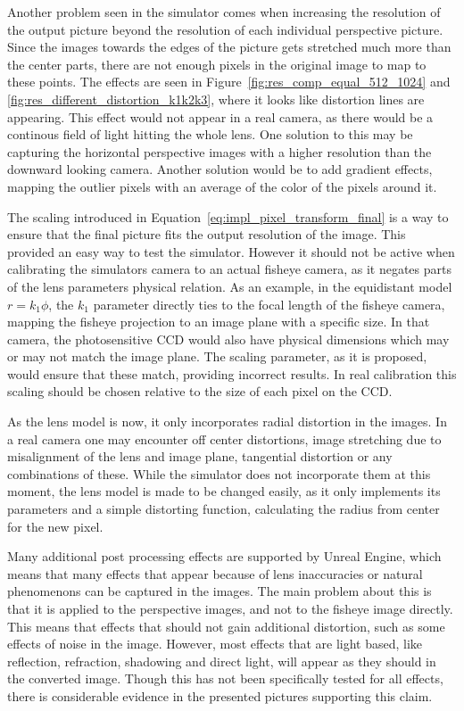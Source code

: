 Another problem seen in the simulator comes when increasing the resolution of the output picture beyond the resolution of each individual perspective picture. Since the images towards the edges of the picture gets stretched much more than the center parts, there are not enough pixels in the original image to map to these points. The effects are seen in Figure~\ref{fig:res_comp_equal_512_1024} and \ref{fig:res_different_distortion_k1k2k3}, where it looks like distortion lines are appearing. This effect would not appear in a real camera, as there would be a continous field of light hitting the whole lens. One solution to this may be capturing the horizontal perspective images with a higher resolution than the downward looking camera. Another solution would be to add gradient effects, mapping the outlier pixels with an average of the color of the pixels around it. 

The scaling introduced in Equation~\eqref{eq:impl_pixel_transform_final} is a way to ensure that the final picture fits the output resolution of the image. This provided an easy way to test the simulator. However it should not be active when calibrating the simulators camera to an actual fisheye camera, as it negates parts of the lens parameters physical relation. As an example, in the equidistant model $r=k_1 \phi$, the $k_1$ parameter directly ties to the focal length of the fisheye camera, mapping the fisheye projection to an image plane with a specific size. In that camera, the photosensitive CCD would also have physical dimensions which may or may not match the image plane. The scaling parameter, as it is proposed, would ensure that these match, providing incorrect results. In real calibration this scaling should be chosen relative to the size of each pixel on the CCD.

As the lens model is now, it only incorporates radial distortion in the images. In a real camera one may encounter off center distortions, image stretching due to misalignment of the lens and image plane, tangential distortion or any combinations of these. While the simulator does not incorporate them at this moment, the lens model is made to be changed easily, as it only implements its parameters and a simple distorting function, calculating the radius from center for the new pixel.

Many additional post processing effects are supported by Unreal Engine, which means that many effects that appear because of lens inaccuracies or natural phenomenons can be captured in the images. The main problem about this is that it is applied to the perspective images, and not to the fisheye image directly. This means that effects that should not gain additional distortion, such as some effects of noise in the image. However, most effects that are light based, like reflection, refraction, shadowing and direct light, will appear as they should in the converted image. Though this has not been specifically tested for all effects, there is considerable evidence in the presented pictures supporting this claim.

